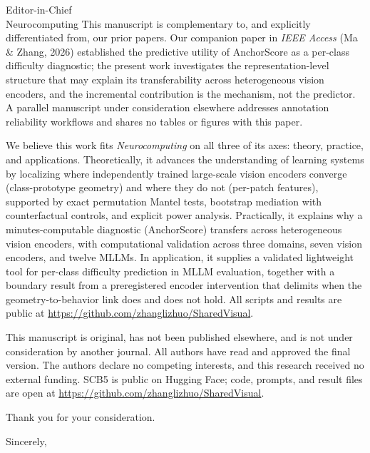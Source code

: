 \documentclass[10pt]{letter}
\begin{document}
\begin{letter}{Editor-in-Chief \\ Neurocomputing}
This manuscript is complementary to, and explicitly differentiated from, our prior papers. Our companion paper in \emph{IEEE Access} (Ma \& Zhang, 2026) established the predictive utility of AnchorScore as a per-class difficulty diagnostic; the present work investigates the representation-level structure that may explain its transferability across heterogeneous vision encoders, and the incremental contribution is the mechanism, not the predictor. A parallel manuscript under consideration elsewhere addresses annotation reliability workflows and shares no tables or figures with this paper.

We believe this work fits \emph{Neurocomputing} on all three of its axes: theory, practice, and applications. Theoretically, it advances the understanding of learning systems by localizing where independently trained large-scale vision encoders converge (class-prototype geometry) and where they do not (per-patch features), supported by exact permutation Mantel tests, bootstrap mediation with counterfactual controls, and explicit power analysis. Practically, it explains why a minutes-computable diagnostic (AnchorScore) transfers across heterogeneous vision encoders, with computational validation across three domains, seven vision encoders, and twelve MLLMs. In application, it supplies a validated lightweight tool for per-class difficulty prediction in MLLM evaluation, together with a boundary result from a preregistered encoder intervention that delimits when the geometry-to-behavior link does and does not hold. All scripts and results are public at \url{https://github.com/zhanglizhuo/SharedVisual}.

This manuscript is original, has not been published elsewhere, and is not under consideration by another journal. All authors have read and approved the final version. The authors declare no competing interests, and this research received no external funding. SCB5 is public on Hugging Face; code, prompts, and result files are open at \url{https://github.com/zhanglizhuo/SharedVisual}.

Thank you for your consideration.

\closing{Sincerely,}

\end{letter}
\end{document}
